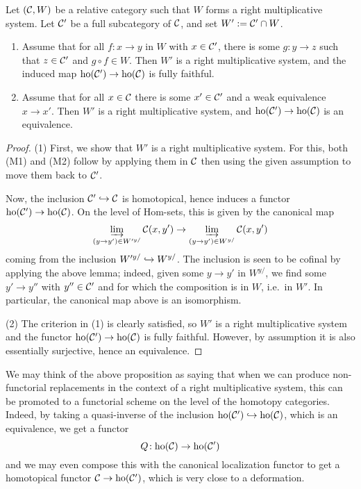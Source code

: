 \begin{proposition}
	Let \((\mathcal{C},W)\) be a relative category such that \(W\) forms a right multiplicative system. Let \(\mathcal{C}'\) be a full subcategory of \(\mathcal{C}\), and set \(W' := \mathcal{C}'\cap W\).
	\begin{enumerate}[label=(\arabic*)]
	\item Assume that for all \(f\!:x\to y\) in \(W\) with \(x\in\mathcal{C}'\), there is some \(g\!:y\to z\) such that \(z\in\mathcal{C}'\) and \(g\circ f \in W\). Then \(W'\) is a right multiplicative system,
	and the induced map \(\operatorname{ho}(\mathcal{C}')\to\operatorname{ho}(\mathcal{C})\) is fully faithful.
	\item Assume that for all \(x\in\mathcal{C}\) there is some \(x'\in\mathcal{C}'\) and a weak equivalence \(x\to x'\). Then \(W'\) is a right multiplicative system, and \(\operatorname{ho}(\mathcal{C}')\to\operatorname{ho}(\mathcal{C})\) is an equivalence.
	\end{enumerate}
\end{proposition}
\begin{proof}
(1) First, we show that \(W'\) is a right multiplicative system. For this, both (M1) and (M2) follow by applying them in \(\mathcal{C}\) then using the given assumption to move them back to \(\mathcal{C}'\).

Now, the inclusion \(\mathcal{C}'\hookrightarrow\mathcal{C}\) is homotopical, hence induces a functor \(\operatorname{ho}(\mathcal{C}')\to\operatorname{ho}(\mathcal{C})\). On the level of Hom-sets, this is given by the canonical map
\[ \varinjlim_{(y\to y')\in W'^{y/}}\mathcal{C}(x,y') \to \varinjlim_{(y\to y')\in W^{y/}}\mathcal{C}(x,y') \]
coming from the inclusion \(W'^{y/} \hookrightarrow W^{y/}\). The inclusion is seen to be cofinal by applying the above lemma; indeed, given some \(y\to y'\) in \(W^{y/}\), we find some \(y'\to y''\) with \(y''\in\mathcal{C}'\)
and for which the composition is in \(W\), i.e.\ in \(W'\). In particular, the canonical map above is an isomorphism.

(2) The criterion in (1) is clearly satisfied, so \(W'\) is a right multiplicative system and the functor \(\operatorname{ho}(\mathcal{C}')\to\operatorname{ho}(\mathcal{C})\) is fully faithful. However, by assumption it is also essentially surjective,
hence an equivalence.
\end{proof}

We may think of the above proposition as saying that when we can produce non-functorial replacements in the context of a right multiplicative system, this can be promoted to a functorial
scheme on the level of the homotopy categories. Indeed, by taking a quasi-inverse of the inclusion \(\operatorname{ho}(\mathcal{C}')\hookrightarrow\operatorname{ho}(\mathcal{C})\), which is an equivalence, we get a functor
\[ Q\!:\operatorname{ho}(\mathcal{C})\to\operatorname{ho}(\mathcal{C}') \]
and we may even compose this with the canonical localization functor to get a homotopical functor \(\mathcal{C}\to\operatorname{ho}(\mathcal{C}')\), which is very close to a deformation.

